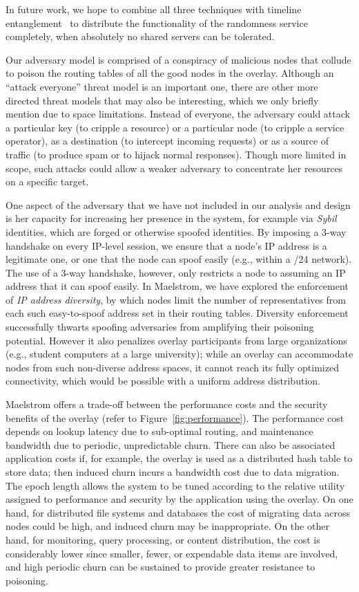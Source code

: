 \documentclass[10pt,twocolumn]{article}
\begin{document}
In future work, we hope to combine all three techniques with
timeline entanglement~\cite{Maniatis2002b} to distribute the
functionality of the randomness service completely, when
absolutely no shared servers can be tolerated. 


\label{sec:diversityEnforcement}
Our adversary model is comprised of a conspiracy of malicious nodes that
collude to poison the routing tables of all the good nodes
in the overlay.  Although an ``attack everyone'' threat model is an
important one, there are other
more directed threat models that may also be interesting, which we only
briefly mention due to space limitations.  Instead of everyone, the adversary could
attack a particular key (to cripple a resource) or a particular node (to
cripple a service operator), as a
destination (to intercept incoming requests) or as a source of traffic
(to produce spam or to hijack normal responses).  Though more
limited in scope, such attacks could
allow a weaker adversary to concentrate her resources on a specific target.

One aspect of the adversary that we have not included in our analysis and
design is her capacity for increasing her presence in the system, for
example via \emph{Sybil}
identities, which are forged or otherwise spoofed identities.
By imposing a 3-way handshake on every IP-level session, we  ensure
that a node's IP address is a legitimate one, or one that the node can
spoof easily (e.g., within a /24 network). The use of a 3-way handshake, however, only restricts a node to assuming an IP address that it can spoof easily. In Maelstrom, we
have explored the enforcement of \emph{IP address diversity}, by which nodes
limit the number of representatives from each such easy-to-spoof address
set in their routing tables.  Diversity enforcement successfully thwarts spoofing
adversaries from amplifying their poisoning potential.  However it also
penalizes overlay participants from large organizations (e.g., student
computers at a large university);  while an overlay can accommodate
nodes from such non-diverse address spaces, it cannot reach its fully
optimized connectivity, which would be possible with a uniform address
distribution.

Maelstrom offers a trade-off between the performance costs and the
security benefits of the overlay (refer to Figure~\ref{fig:performance}).
The performance cost depends
on lookup latency due to sub-optimal routing, and maintenance
bandwidth due to periodic, unpredictable churn.  There can also be
associated application costs if, for example, the overlay is used as a
distributed hash table to store data; then induced churn incurs a
bandwidth cost due to data migration. The epoch length allows
the system to be tuned according to the relative utility assigned to
performance and security by the
application using the overlay.  On one hand, 
for distributed file systems and databases the 
cost of migrating data
across nodes could be high, and induced churn
may be inappropriate. On the other hand, for
monitoring, query processing, or content distribution, the
cost is considerably lower since smaller, fewer, or expendable data items are
involved, and high periodic churn can be sustained to
provide greater resistance to poisoning.
\end{document}
